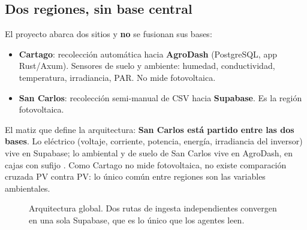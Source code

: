 \subsection{Dos regiones, sin base central}

El proyecto abarca dos sitios y \textbf{no} se fusionan sus bases:

\begin{itemize}[leftmargin=*,itemsep=2pt]
  \item \textbf{Cartago}: recolección automática hacia \textbf{AgroDash} (PostgreSQL,
    app Rust/Axum). Sensores de suelo y ambiente: humedad, conductividad, temperatura,
    irradiancia, PAR. No mide fotovoltaica.
  \item \textbf{San Carlos}: recolección semi-manual de CSV hacia \textbf{Supabase}.
    Es la región fotovoltaica.
\end{itemize}

El matiz que define la arquitectura: \textbf{San Carlos está partido entre las dos
bases}. Lo eléctrico (voltaje, corriente, potencia, energía, irradiancia del inversor)
vive en Supabase; lo ambiental y de suelo de San Carlos vive en AgroDash, en cajas con
sufijo . Como Cartago no mide fotovoltaica, no existe comparación cruzada
PV contra PV: lo único común entre regiones son las variables ambientales.

\begin{figure}[p]
\centering
\resizebox{\textwidth}{!}{}
\caption{Arquitectura global. Dos rutas de ingesta independientes convergen en una sola
Supabase, que es lo único que los agentes leen.}
\end{figure}
